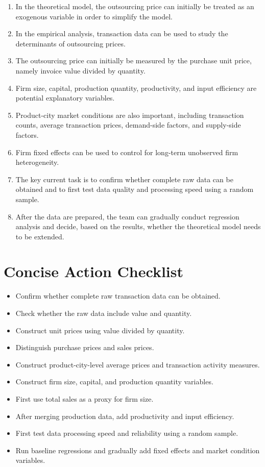 \documentclass[11pt,a4paper]{article}
\begin{document}
\begin{enumerate}
    \item In the theoretical model, the outsourcing price can initially be treated as an exogenous variable in order to simplify the model.
    \item In the empirical analysis, transaction data can be used to study the determinants of outsourcing prices.
    \item The outsourcing price can initially be measured by the purchase unit price, namely invoice value divided by quantity.
    \item Firm size, capital, production quantity, productivity, and input efficiency are potential explanatory variables.
    \item Product-city market conditions are also important, including transaction counts, average transaction prices, demand-side factors, and supply-side factors.
    \item Firm fixed effects can be used to control for long-term unobserved firm heterogeneity.
    \item The key current task is to confirm whether complete raw data can be obtained and to first test data quality and processing speed using a random sample.
    \item After the data are prepared, the team can gradually conduct regression analysis and decide, based on the results, whether the theoretical model needs to be extended.
\end{enumerate}

\section{Concise Action Checklist}

\begin{itemize}
    \item[$\square$] Confirm whether complete raw transaction data can be obtained.
    \item[$\square$] Check whether the raw data include value and quantity.
    \item[$\square$] Construct unit prices using value divided by quantity.
    \item[$\square$] Distinguish purchase prices and sales prices.
    \item[$\square$] Construct product-city-level average prices and transaction activity measures.
    \item[$\square$] Construct firm size, capital, and production quantity variables.
    \item[$\square$] First use total sales as a proxy for firm size.
    \item[$\square$] After merging production data, add productivity and input efficiency.
    \item[$\square$] First test data processing speed and reliability using a random sample.
    \item[$\square$] Run baseline regressions and gradually add fixed effects and market condition variables.
\end{itemize}
\end{document}
